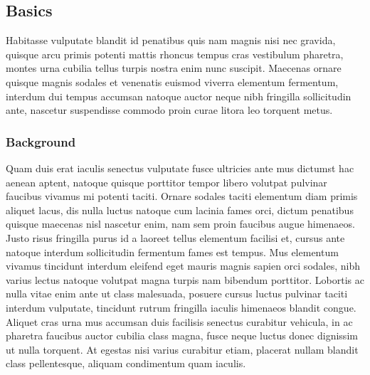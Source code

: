 \documentclass[11pt]{article}
\begin{document}
\subsection{Basics}

Habitasse vulputate blandit id penatibus quis nam magnis nisi nec gravida, quisque arcu primis potenti mattis rhoncus tempus cras vestibulum pharetra, montes urna cubilia tellus turpis nostra enim nunc suscipit. Maecenas ornare quisque magnis sodales et venenatis euismod viverra elementum fermentum, interdum dui tempus accumsan natoque auctor neque nibh fringilla sollicitudin ante, nascetur suspendisse commodo proin curae litora leo torquent metus.





\subsubsection{Background}



Quam duis erat iaculis senectus vulputate fusce ultricies ante mus dictumst hac aenean aptent, natoque quisque porttitor tempor libero volutpat pulvinar faucibus vivamus mi potenti taciti. Ornare sodales taciti elementum diam primis aliquet lacus, dis nulla luctus natoque cum lacinia fames orci, dictum penatibus quisque maecenas nisl nascetur enim, nam sem proin faucibus augue himenaeos. Justo risus fringilla purus id a laoreet tellus elementum facilisi et, cursus ante natoque interdum sollicitudin fermentum fames est tempus. Mus elementum vivamus tincidunt interdum eleifend eget mauris magnis sapien orci sodales, nibh varius lectus natoque volutpat magna turpis nam bibendum porttitor. Lobortis ac nulla vitae enim ante ut class malesuada, posuere cursus luctus pulvinar taciti interdum vulputate, tincidunt rutrum fringilla iaculis himenaeos blandit congue. Aliquet cras urna mus accumsan duis facilisis senectus curabitur vehicula, in ac pharetra faucibus auctor cubilia class magna, fusce neque luctus donec dignissim ut nulla torquent. At egestas nisi varius curabitur etiam, placerat nullam blandit class pellentesque, aliquam condimentum quam iaculis.
	
\end{document}
